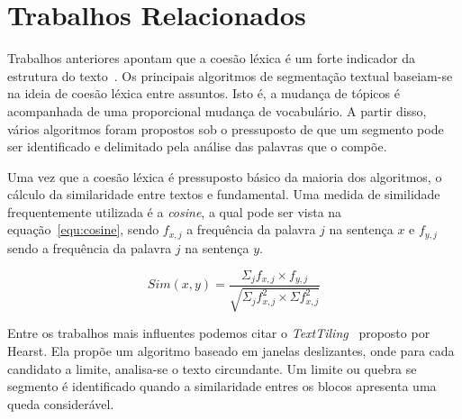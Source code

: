 \section{Trabalhos Relacionados}
	\label{sec:trabalhos}



Trabalhos anteriores apontam que a coesão léxica é um forte indicador da estrutura do texto~\cite{Galley2003}.
Os principais algoritmos de segmentação textual baseiam-se na ideia de coesão léxica entre assuntos. Isto é, a mudança de tópicos é acompanhada de uma proporcional mudança de vocabulário. A partir disso, vários algoritmos foram propostos sob o pressuposto de que um segmento pode ser identificado e delimitado pela análise das palavras que o compõe.

Uma vez que a coesão léxica é pressuposto básico da maioria dos algoritmos, o cálculo da similaridade entre textos e fundamental. Uma medida de similidade frequentemente utilizada é a \textit{cosine}, a qual pode ser vista na equação~\ref{equ:cosine}, sendo $f_{x,j}$ a frequência da palavra $j$ na sentença $x$ e $f_{y,j}$ sendo a frequência da palavra $j$ na sentença $y$.


\begin{equation}
Sim(x,y) = \frac
{\Sigma_j f_{x,j} \times f_{y,j}}
{\sqrt{\Sigma_j f^2_{x,j} \times \Sigma f^2_{x,j}}}
\label{equ:cosine}
\end{equation}










Entre os trabalhos mais influentes podemos citar o \textit{TextTiling}~\cite{Hearst1994} proposto por Hearst. Ela propõe um algoritmo baseado em janelas deslizantes, onde para cada candidato a limite, analisa-se o texto circundante. Um limite ou quebra se segmento é identificado quando a similaridade entres os blocos apresenta uma queda considerável.


